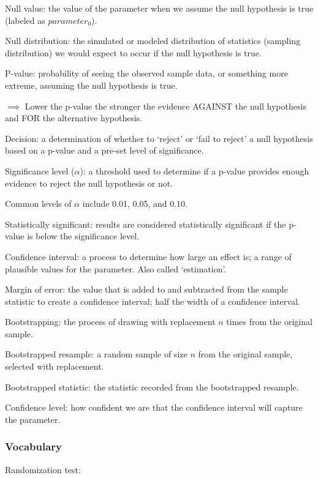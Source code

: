 \documentclass[
]{report}
\newcommand{\rgs}{\vspace{12pt}} %
\newcommand{\rgi}{\hspace{24pt}}  %
\begin{document}
Null value: the value of the parameter when we assume the null hypothesis is true (labeled as \(parameter_0\)).

Null distribution: the simulated or modeled distribution of statistics (sampling distribution) we would expect to occur if the null hypothesis is true.

P-value: probability of seeing the observed sample data, or something more extreme, assuming the null hypothesis is true.

\(\implies\) Lower the p-value the stronger the evidence AGAINST the null hypothesis and FOR the alternative hypothesis.

Decision: a determination of whether to `reject' or `fail to reject' a null hypothesis based on a p-value and a pre-set level of significance.

Significance level (\(\alpha\)): a threshold used to determine if a p-value provides enough evidence to reject the null hypothesis or not.

\rgi Common levels of \(\alpha\) include 0.01, 0.05, and 0.10.

Statistically significant: results are considered statistically significant if the p-value is below the significance level.

Confidence interval: a process to determine how large an effect is; a range of plausible values for the parameter. Also called `estimation'.

Margin of error: the value that is added to and subtracted from the sample statistic to create a confidence interval; half the width of a confidence interval.

Bootstrapping: the process of drawing with replacement \(n\) times from the original sample.

Bootstrapped resample: a random sample of size \(n\) from the original sample, selected with replacement.

Bootstrapped statistic: the statistic recorded from the bootstrapped resample.

Confidence level: how confident we are that the confidence interval will capture the parameter.

\hypertarget{vocabulary-16}{%
\subsubsection*{Vocabulary}\label{vocabulary-16}}

Randomization test:
\rgs
\end{document}
